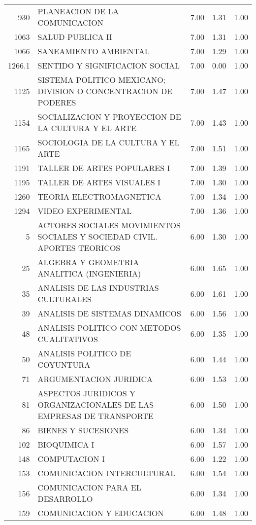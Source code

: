 \documentclass[12pt]{article}
\begin{document}
\begin{table}[ht]
\begin{tabular}{rlrrr}
  930 & PLANEACION DE LA COMUNICACION & 7.00 & 1.31 & 1.00 \\ 
  1063 & SALUD PUBLICA II & 7.00 & 1.31 & 1.00 \\ 
  1066 & SANEAMIENTO AMBIENTAL & 7.00 & 1.29 & 1.00 \\ 
  1266.1 & SENTIDO Y SIGNIFICACION SOCIAL & 7.00 & 0.00 & 1.00 \\ 
  1125 & SISTEMA POLITICO MEXICANO; DIVISION O CONCENTRACION DE PODERES & 7.00 & 1.47 & 1.00 \\ 
  1154 & SOCIALIZACION Y PROYECCION DE LA CULTURA Y EL ARTE & 7.00 & 1.43 & 1.00 \\ 
  1165 & SOCIOLOGIA DE LA CULTURA Y EL ARTE & 7.00 & 1.51 & 1.00 \\ 
  1191 & TALLER DE ARTES POPULARES I & 7.00 & 1.39 & 1.00 \\ 
  1195 & TALLER DE ARTES VISUALES I & 7.00 & 1.30 & 1.00 \\ 
  1260 & TEORIA ELECTROMAGNETICA & 7.00 & 1.34 & 1.00 \\ 
  1294 & VIDEO EXPERIMENTAL & 7.00 & 1.36 & 1.00 \\ 
  5 & ACTORES SOCIALES MOVIMIENTOS SOCIALES Y SOCIEDAD CIVIL. APORTES TEORICOS & 6.00 & 1.30 & 1.00 \\ 
  25 & ALGEBRA Y GEOMETRIA ANALITICA (INGENIERIA) & 6.00 & 1.65 & 1.00 \\ 
  35 & ANALISIS DE LAS INDUSTRIAS CULTURALES & 6.00 & 1.61 & 1.00 \\ 
  39 & ANALISIS DE SISTEMAS DINAMICOS & 6.00 & 1.56 & 1.00 \\ 
  48 & ANALISIS POLITICO CON METODOS CUALITATIVOS & 6.00 & 1.35 & 1.00 \\ 
  50 & ANALISIS POLITICO DE COYUNTURA & 6.00 & 1.44 & 1.00 \\ 
  71 & ARGUMENTACION JURIDICA & 6.00 & 1.53 & 1.00 \\ 
  81 & ASPECTOS JURIDICOS Y ORGANIZACIONALES DE LAS EMPRESAS DE TRANSPORTE & 6.00 & 1.50 & 1.00 \\ 
  86 & BIENES Y SUCESIONES & 6.00 & 1.34 & 1.00 \\ 
  102 & BIOQUIMICA I & 6.00 & 1.57 & 1.00 \\ 
  148 & COMPUTACION I & 6.00 & 1.22 & 1.00 \\ 
  153 & COMUNICACION INTERCULTURAL & 6.00 & 1.54 & 1.00 \\ 
  156 & COMUNICACION PARA EL DESARROLLO & 6.00 & 1.34 & 1.00 \\ 
  159 & COMUNICACION Y EDUCACION & 6.00 & 1.48 & 1.00 \\ 

\end{tabular}
\end{table}
\end{document}
